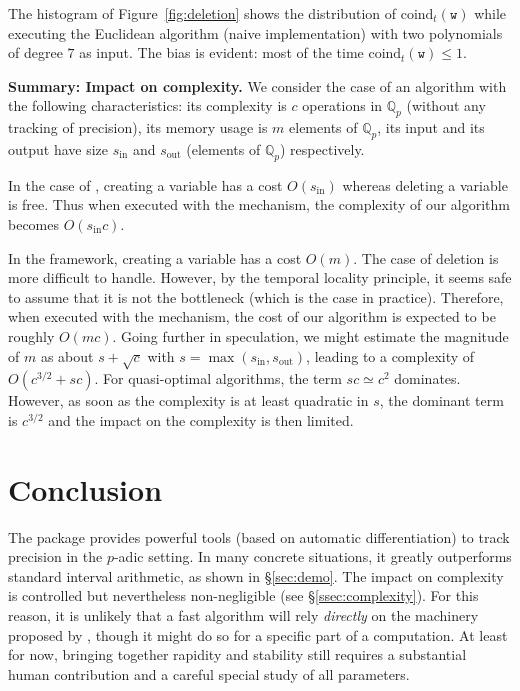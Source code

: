 \documentclass[sigconf]{acmart}
\newcommand{\Q}{\mathbb Q}
\newcommand{\Qp}{\Q_p}
\newcommand{\ttw}{\texttt{w}\xspace}
\newcommand{\ZpL}{\text{\color{output} \rm \tt ZpL}\xspace}
\newcommand{\ZpLC}{\text{\color{output} \rm \tt ZpLC}\xspace}
\newcommand{\ZpLF}{\text{\color{output} \rm \tt ZpLF}\xspace}
\newcommand{\coind}{\text{coind}}
\newcommand{\inp}{\text{in}}
\newcommand{\out}{\text{out}}
\theoremstyle{definition}
\begin{document}
%
The histogram of Figure~\ref{fig:deletion} shows 
the distribution of $\coind_t(\ttw)$ while executing the Euclidean
algorithm (naive implementation) with two polynomials of degree $7$
as input. The bias is evident: most of the time $\coind_t(\ttw) \leq
1$.

\medskip

\noindent \textbf{Summary: Impact on complexity.}
% 
We consider the case of an algorithm with the following characteristics: 
its complexity is $c$ operations in $\Qp$ (without any tracking of 
precision), its memory usage is $m$ elements of $\Qp$, its input and its 
output have size $s_\inp$ and $s_\out$ (elements of $\Qp$) respectively.

In the case of \ZpLF, creating a variable has a cost $O(s_\inp)$ 
whereas deleting a variable is free. 
Thus when executed with the \ZpLF mechanism, the complexity of our
algorithm becomes $O(s_\inp c)$.

In the \ZpLC framework, creating a variable has a cost $O(m)$. The case 
of deletion is more difficult to handle. However, by the temporal 
locality principle, it seems safe to assume that it is not the 
bottleneck (which is the case in practice). Therefore, when executed 
with the \ZpLF mechanism, the cost of our algorithm is expected to be 
roughly $O(mc)$. Going further in speculation, we might estimate the 
magnitude of $m$ as about $s + \sqrt c$ with $s = \max(s_\inp, 
s_\out)$, leading to a complexity of $O(c^{3/2} + sc)$. For 
quasi-optimal algorithms, the term $sc \simeq c^2$ dominates. However, 
as soon as the complexity is at least quadratic in $s$, the dominant 
term is $c^{3/2}$ and the impact on the complexity is then limited.

\section{Conclusion}
\label{sec:conclusion}

The package \ZpL provides powerful tools (based on automatic 
differentiation) to track precision in the $p$-adic setting. In many 
concrete situations, it greatly outperforms standard interval arithmetic,
as shown in \S \ref{sec:demo}.
The impact on complexity is controlled but nevertheless non-negligible 
(see \S \ref{ssec:complexity}). For this reason, it is unlikely that a fast
algorithm will rely \emph{directly} on the machinery proposed by \ZpL,
though it might do so for a specific part of a computation.
At least for now, bringing together rapidity and stability
still requires a substantial human contribution 
and a careful special study of all parameters.
\end{document}
